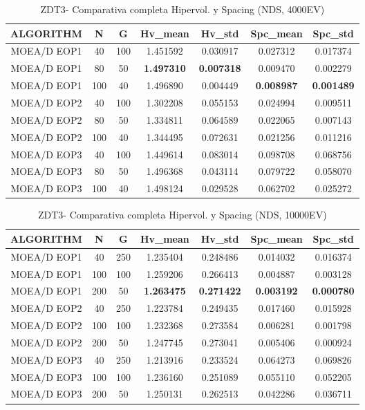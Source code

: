 \begin{table}[H]
\centering
\renewcommand{\arraystretch}{1.5}
\begin{tabular}{ccccccc}
\toprule
   ALGORITHM &    N &    G &   Hv\_mean &    Hv\_std &  Spc\_mean &   Spc\_std \\
\midrule
 MOEA/D EOP1 &   40 &  100 &  1.451592 &  0.030917 &  0.027312 &  0.017374 \\
 MOEA/D EOP1 &   80 &   50 &  \textbf{1.497310} &  \textbf{0.007318} &  0.009470 &  0.002279 \\
 MOEA/D EOP1 &  100 &   40 &  1.496890 &  0.004449 &  \textbf{0.008987} &  \textbf{0.001489} \\
 MOEA/D EOP2 &   40 &  100 &  1.302208 &  0.055153 &  0.024994 &  0.009511 \\
 MOEA/D EOP2 &   80 &   50 &  1.334811 &  0.064589 &  0.022065 &  0.007143 \\
 MOEA/D EOP2 &  100 &   40 &  1.344495 &  0.072631 &  0.021256 &  0.011216 \\
 MOEA/D EOP3 &   40 &  100 &  1.449614 &  0.083014 &  0.098708 &  0.068756 \\
 MOEA/D EOP3 &   80 &   50 &  1.496368 &  0.043114 &  0.079722 &  0.058070 \\
 MOEA/D EOP3 &  100 &   40 &  1.498124 &  0.029528 &  0.062702 &  0.025272 \\
\bottomrule
\end{tabular}

\caption{ZDT3- Comparativa completa Hipervol. y Spacing (NDS, 4000EV)}
\label{table:3}
\end{table}

\begin{table}[H]
\centering
\renewcommand{\arraystretch}{1.5}
\begin{tabular}{ccccccc}
\toprule
   ALGORITHM &    N &    G &   Hv\_mean &    Hv\_std &  Spc\_mean &   Spc\_std \\
\midrule
 MOEA/D EOP1 &   40 &  250 &  1.235404 &  0.248486 &  0.014032 &  0.016374 \\
 MOEA/D EOP1 &  100 &  100 &  1.259206 &  0.266413 &  0.004887 &  0.003128 \\
 MOEA/D EOP1 &  200 &   50 &  \textbf{1.263475} &  \textbf{0.271422} &  \textbf{0.003192} &  \textbf{0.000780} \\
 MOEA/D EOP2 &   40 &  250 &  1.223784 &  0.249435 &  0.017460 &  0.015928 \\
 MOEA/D EOP2 &  100 &  100 &  1.232368 &  0.273584 &  0.006281 &  0.001798 \\
 MOEA/D EOP2 &  200 &   50 &  1.247745 &  0.273041 &  0.005406 &  0.000924 \\
 MOEA/D EOP3 &   40 &  250 &  1.213916 &  0.233524 &  0.064273 &  0.069826 \\
 MOEA/D EOP3 &  100 &  100 &  1.236160 &  0.251089 &  0.055110 &  0.052205 \\
 MOEA/D EOP3 &  200 &   50 &  1.250131 &  0.262513 &  0.042286 &  0.036711 \\
\bottomrule
\end{tabular}
\caption{ZDT3- Comparativa completa Hipervol. y Spacing (NDS, 10000EV)}
\label{table:4}
\end{table}

